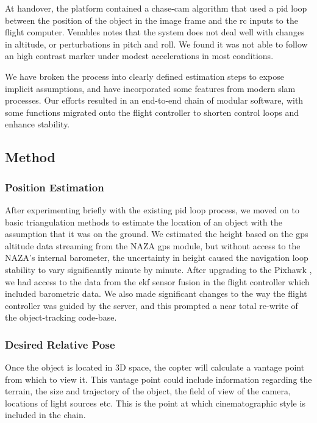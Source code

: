 \documentclass[a4paper, 11pt, titlepage]{article}
\begin{document}
    At handover, the platform contained a chase-cam algorithm that used a \gls{pid} loop between the position of the object in the image frame and the \gls{rc} inputs to the flight computer.  Venables \cite{Venables} notes that the system does not deal well with changes in altitude, or perturbations in pitch and roll.  We found it was not able to follow an high contrast marker under modest accelerations in most conditions.

    We have broken the process into clearly defined estimation steps to expose implicit assumptions, and have incorporated some features from modern \gls{slam} processes.  Our efforts resulted in an end-to-end chain of modular software, with some functions migrated onto the flight controller to shorten control loops and enhance stability. 

  \subsection{Method}

    \subsubsection{Position Estimation}
      After experimenting briefly with the existing \gls{pid} loop process, we moved on to basic triangulation methods to estimate the location of an object with the assumption that it was on the ground.  We estimated the height based on the \gls{gps} altitude data streaming from the NAZA \gls{gps} module, but without access to the NAZA's internal barometer, the uncertainty in height caused the navigation loop stability to vary significantly minute by minute.
      After upgrading to the Pixhawk \cite{3dr-pixhawk}, we had access to the data from the \gls{ekf} sensor fusion in the flight controller which included barometric data.  We also made significant changes to the way the flight controller was guided by the server, and this prompted a near total re-write of the object-tracking code-base.

    \subsubsection{Desired Relative Pose}
      Once the object is located in 3D space, the copter will calculate a vantage point from which to view it.
      This vantage point could include information regarding the terrain, the size and trajectory of the object, the field of view of the camera, locations of light sources etc.  This is the point at which cinematographic style is included in the chain.
\end{document}
